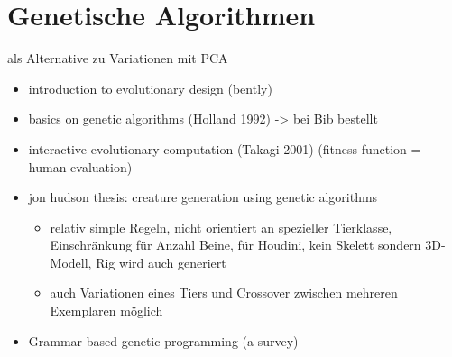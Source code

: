 \section{Genetische Algorithmen}

als Alternative zu Variationen mit PCA

\begin{itemize}
 \item introduction to evolutionary design (bently)
 \item basics on genetic algorithms (Holland 1992) -> bei Bib bestellt
 \item interactive evolutionary computation (Takagi 2001) (fitness function = human evaluation)
 \item jon hudson thesis: creature generation using genetic algorithms \cite{JonHudson}
   \begin{itemize}
    \item relativ simple Regeln, nicht orientiert an spezieller Tierklasse, Einschränkung für Anzahl Beine, für Houdini, kein Skelett sondern 3D-Modell, Rig wird auch generiert
    \item auch Variationen eines Tiers und Crossover zwischen mehreren Exemplaren möglich
   \end{itemize}
  \item Grammar based genetic programming (a survey) 
\end{itemize}


